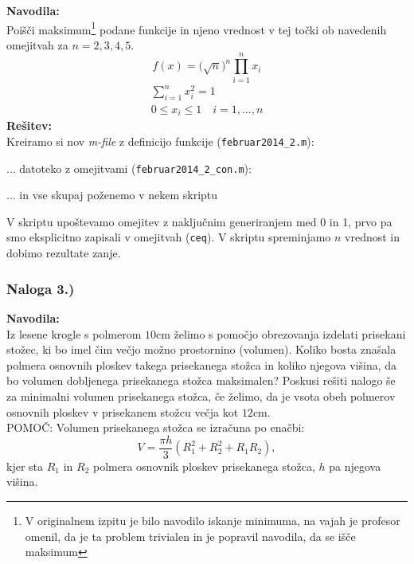 \documentclass[a4paper,11pt]{article}
\begin{document}
\textbf{Navodila:} \\
Poišči maksimum\footnote{V originalnem izpitu je bilo navodilo iskanje minimuma, na vajah je profesor omenil, da je ta problem trivialen in je popravil navodila, da se išče maksimum} podane funkcije in njeno vrednost v tej točki ob navedenih omejitvah za $n=2,3,4,5$.
\begin{equation} 
f(x) = \big( \sqrt{n} \big)^{n} \prod_{i=1}^n x_i
\end{equation}
\begin{equation}
\begin{gathered}
	\sum_{i=1}^n x_i^2 = 1 \\
	0 \leq x_i \leq 1 \quad i=1, ..., n
\end{gathered}
\end{equation}
\textbf{Rešitev:} \\
Kreiramo si nov \textit{m-file} z definicijo funkcije (\texttt{februar2014\_2.m}):

... datoteko z omejitvami (\texttt{februar2014\_2\_con.m}):

... in vse skupaj poženemo v nekem skriptu

V skriptu upoštevamo omejitev z naključnim generiranjem med 0 in 1, prvo pa smo eksplicitno zapisali v omejitvah (\texttt{ceq}). V skriptu spreminjamo $n$ vrednost
in dobimo rezultate zanje.

\subsubsection{Naloga 3.)}
\label{task:februar2014_3}

\textbf{Navodila:} \\
Iz lesene krogle s polmerom $10\si{\cm}$ želimo s pomočjo obrezovanja izdelati prisekani stožec, ki bo imel čim večjo možno prostornino (volumen). Koliko bosta znašala polmera osnovnih ploskev takega prisekanega stožca in koliko njegova višina, da bo volumen dobljenega prisekanega stožca maksimalen? Poskusi rešiti nalogo še za minimalni volumen prisekanega stožca, če želimo, da je vsota obeh polmerov osnovnih ploskev v prisekanem stožcu večja kot $12\si{\cm}$.\\
POMOČ: Volumen prisekanega stožca se izračuna po enačbi:
\begin{equation*}
V = \frac{\pi h}{3} \left( R_1^2 + R_2^2 + R_1R_2 \right),
\end{equation*}
kjer sta $R_1$ in $R_2$ polmera osnovnik ploskev prisekanega stožca, $h$ pa njegova višina.
\end{document}
